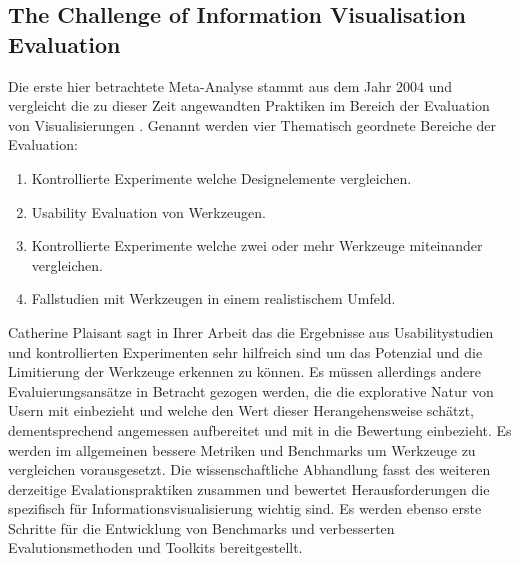 \documentclass[draft=false
              ,paper=a4
              ,twoside=false
              ,fontsize=11pt
              ,headsepline
              ,BCOR10mm
              ,DIV11
              ]{scrbook}
\begin{document}
\subsection{The Challenge of Information Visualisation Evaluation} %
\label{sub:the_challenge_of_information_visualisation_evaluation}
Die erste hier betrachtete Meta-Analyse stammt aus dem Jahr 2004 und vergleicht die zu dieser Zeit angewandten Praktiken im Bereich der Evaluation von Visualisierungen \cite{plaisant_challenge_2004}. Genannt werden vier Thematisch geordnete Bereiche der Evaluation:

\begin{enumerate}
  \item Kontrollierte Experimente welche Designelemente vergleichen.
  \item Usability Evaluation von Werkzeugen.
  \item Kontrollierte Experimente welche zwei oder mehr Werkzeuge miteinander vergleichen.
  \item Fallstudien mit Werkzeugen in einem realistischem Umfeld.
\end{enumerate}

Catherine Plaisant  sagt in Ihrer Arbeit das die Ergebnisse aus Usabilitystudien und kontrollierten Experimenten sehr hilfreich sind um das Potenzial und die Limitierung der Werkzeuge erkennen zu können. Es müssen allerdings andere Evaluierungsansätze in Betracht gezogen werden, die die explorative Natur von Usern mit einbezieht und welche den Wert dieser Herangehensweise schätzt, dementsprechend angemessen aufbereitet und mit in die Bewertung einbezieht. Es werden im allgemeinen bessere Metriken und Benchmarks um Werkzeuge zu vergleichen vorausgesetzt. Die wissenschaftliche Abhandlung fasst des weiteren derzeitige Evalationspraktiken zusammen und bewertet Herausforderungen die spezifisch für Informationsvisualisierung wichtig sind. Es werden ebenso erste Schritte für die Entwicklung von Benchmarks und verbesserten Evalutionsmethoden und Toolkits bereitgestellt.
\end{document}
